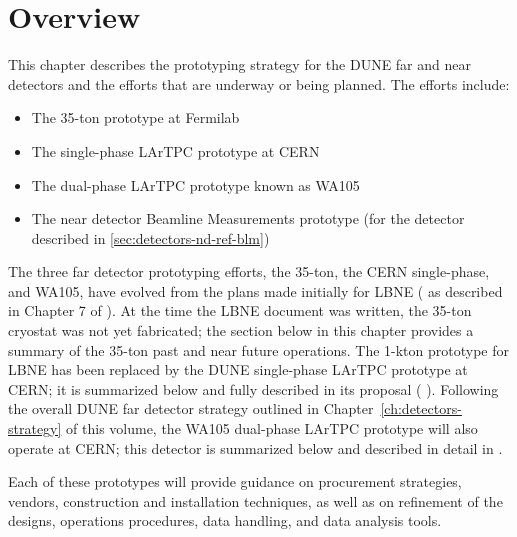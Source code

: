 \section{Overview}
\label{sec:proto-overview}


This chapter describes the prototyping strategy for the DUNE  far and near detectors and the efforts that are underway or being planned.  The efforts include:

\begin{itemize}
\item The 35-ton prototype at Fermilab
\item The single-phase LArTPC prototype at CERN
\item The dual-phase LArTPC prototype known as WA105 
\item The near detector Beamline Measurements prototype (for the detector described in \ref{sec:detectors-nd-ref-blm})
\end{itemize}

The three far detector prototyping efforts, the 35-ton, the CERN single-phase, and WA105, have evolved from the plans made initially for LBNE  ( as described in Chapter 7 of \anxlbnefd ).  At the time the LBNE document was written, the 35-ton cryostat was not yet fabricated; the section below in this chapter provides a summary of the 35-ton past and near future operations.  The 1-kton prototype for LBNE has been replaced by the DUNE single-phase LArTPC prototype at CERN; it is summarized below and fully described in its proposal ( \anxcernproto ).  Following the overall DUNE far detector strategy outlined in Chapter~\ref{ch:detectors-strategy} of this volume, the WA105 dual-phase LArTPC prototype will also operate at CERN; this detector is summarized below and described in detail in \anxdualtdr .


Each of these prototypes will provide guidance on procurement strategies, vendors, construction and installation techniques, as well as on refinement of the designs, operations procedures, data handling, and data analysis tools.

